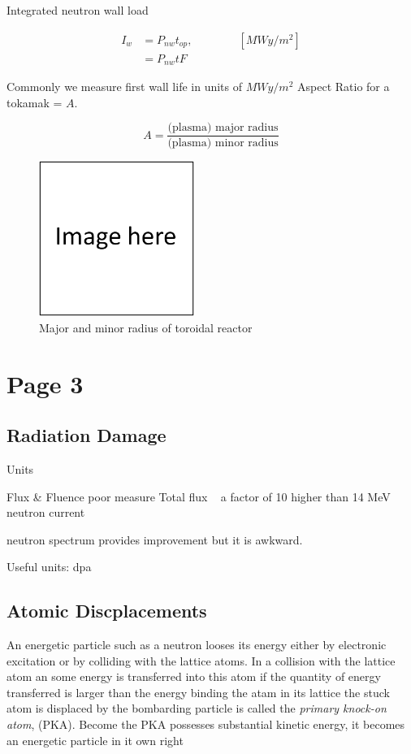 \documentclass[11pt]{article}
\begin{document}
Integrated neutron wall load

\begin{align}
I_w &= P_{nw} t_{op},  \qquad \qquad [MW y/m^2]     \\
	&= P_{nw} t F
\end{align}

Commonly we measure first wall life in units of $MW y/m^2$
Aspect Ratio for a tokamak = $A$.

\begin{equation}
	A = \frac{\text{(plasma) major radius}}{\text{(plasma) minor radius}}
\end{equation}

\begin{figure}[!htp]
\centering
\includegraphics[width=0.45\textwidth]{figs/fillImage.png}
\caption[width=\textwidth]{Major and minor radius of toroidal reactor}
\label{fig:reactorRadius}
\end{figure}

\section{Page 3}

\subsection{Radiation Damage}
Units

Flux \& Fluence poor measure
Total flux ~ a factor of 10 higher than 14 MeV neutron current

neutron spectrum provides improvement but it is awkward.

Useful units: dpa

\subsection{Atomic Discplacements}
An energetic particle such as a neutron looses its energy either by electronic excitation or by colliding with the lattice atoms. In a collision with the lattice atom an some energy is transferred into this atom if the quantity of energy transferred is larger than the energy binding the atam in its lattice the stuck atom is displaced by the bombarding particle is called the \textit{primary knock-on atom}, (PKA). Become the PKA possesses substantial kinetic energy, it becomes an energetic particle in it own right
\end{document}
